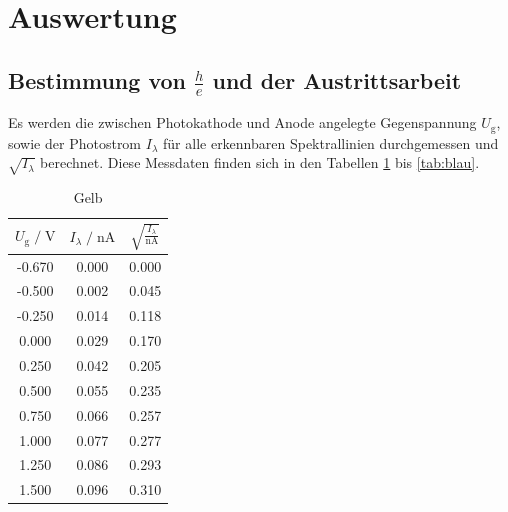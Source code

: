 \section{Auswertung}
\label{sec:Auswertung}

\subsection{Bestimmung von $\frac{h}{e}$ und der Austrittsarbeit}

Es werden die zwischen Photokathode und Anode angelegte Gegenspannung $U_\text{g}$, sowie der 
Photostrom $I_\lambda$ für alle erkennbaren Spektrallinien durchgemessen und $\sqrt{I_\lambda}$ berechnet. 
Diese Messdaten finden sich in den Tabellen \ref{tab:gelb} bis \ref{tab:blau}. 

\begin{table}
    \centering
    \caption{Gelb}
    \label{tab:gelb}
    \begin{tabular}{c c c}
    \toprule
    $ U_\text{g} \;/\; \si{\volt} $ & $I_\lambda \;/\; \si{\nano\ampere}$ &
    $ \sqrt{\frac{I_\lambda}{\si{\nano\ampere}}}$\\
    \midrule 
      -0.670 & 0.000 & 0.000\\
      -0.500 & 0.002 & 0.045\\
      -0.250 & 0.014 & 0.118\\
       0.000 & 0.029 & 0.170\\
       0.250 & 0.042 & 0.205\\
       0.500 & 0.055 & 0.235\\
       0.750 & 0.066 & 0.257\\
       1.000 & 0.077 & 0.277\\
       1.250 & 0.086 & 0.293\\
       1.500 & 0.096 & 0.310\\        
    \bottomrule
    \end{tabular}
\end{table}

